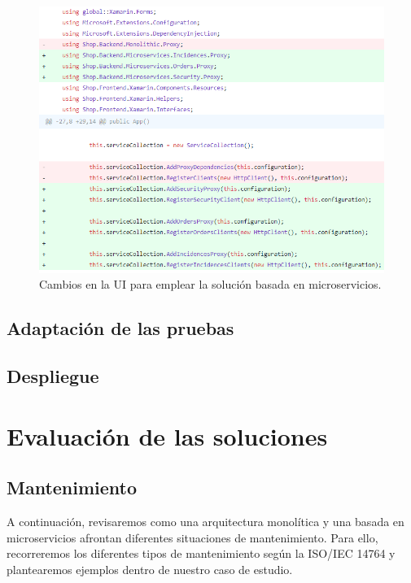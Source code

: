\documentclass[11pt,spanish,listoffigures]{tfgetsinf}
\begin{document}
\begin{figure}[h]
\centering
\includegraphics[scale=0.9]{ChangesUI}
\caption{Cambios en la UI para emplear la solución basada en microservicios.}
\label{fig:ChangesUI}
\end{figure}


\section{Adaptación de las pruebas}


\section{Despliegue}

%

\chapter{Evaluación de las soluciones}

\section{Mantenimiento} \label{sect:Mantenimiento}

A continuación, revisaremos como una arquitectura monolítica y una basada en microservicios afrontan diferentes situaciones de mantenimiento. Para ello, recorreremos los diferentes tipos de mantenimiento según la ISO/IEC 14764 y plantearemos ejemplos dentro de nuestro caso de estudio. 
\end{document}
